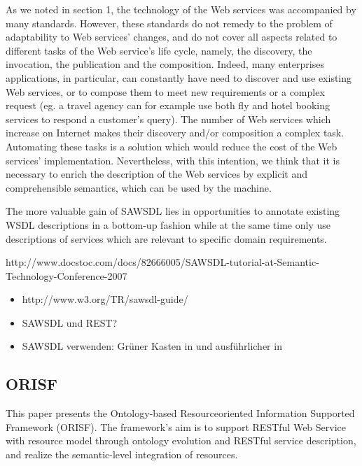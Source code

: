 As we noted in section 1, the technology of the Web
services was accompanied by many standards. However,
these standards do not remedy to the problem of adaptability
to Web services’ changes, and do not cover all aspects related
to different tasks of the Web service’s life cycle, namely, the
discovery, the invocation, the publication and the
composition. Indeed, many enterprises applications, in
particular, can constantly have need to discover and use
existing Web services, or to compose them to meet new
requirements or a complex request (eg. a travel agency can
for example use both fly and hotel booking services to
respond a customer’s query). The number of Web services
which increase on Internet makes their discovery and/or
composition a complex task. Automating these tasks is a
solution which would reduce the cost of the Web services’
implementation. Nevertheless, with this intention, we think
that it is necessary to enrich the description of the Web
services by explicit and comprehensible semantics, which can
be used by the machine. \cite{ei-sawsdl}

The more valuable
gain of SAWSDL lies in opportunities to annotate existing
WSDL descriptions in a bottom-up fashion while at the
same time only use descriptions of services which are relevant
to specific domain requirements. \cite{WSMOLITE}

http://www.docstoc.com/docs/82666005/SAWSDL-tutorial-at-Semantic-Technology-Conference-2007

\begin{itemize}
\item http://www.w3.org/TR/sawsdl-guide/
\item \ac{SAWSDL} und \ac{REST}?
\item \ac{SAWSDL} verwenden: Grüner Kasten in \cite[S.63]{ky-sawsdl} und ausführlicher in \cite{vr-sesa}
\end{itemize}

\subsection{ORISF}

This paper presents the Ontology-based Resourceoriented
Information Supported Framework (ORISF). The
framework’s aim is to support RESTful Web Service with
resource model through ontology evolution and RESTful
service description, and realize the semantic-level
integration of resources. \cite{zg-ontorest}
